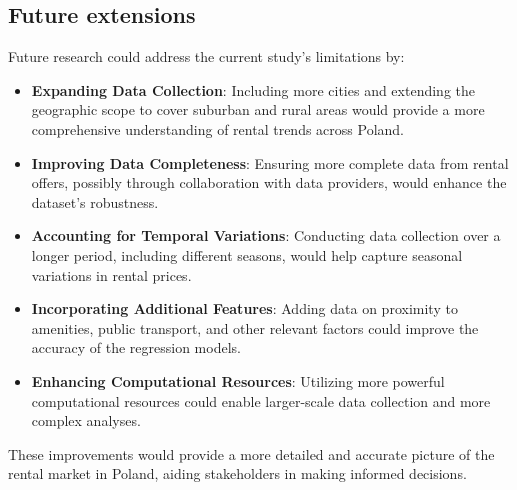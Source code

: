\subsection{Future extensions}
Future research could address the current study's limitations by:
\begin{itemize}
    \item \textbf{Expanding Data Collection}: Including more cities and extending the geographic scope to cover suburban and rural areas would provide a more comprehensive understanding of rental trends across Poland.
    \item \textbf{Improving Data Completeness}: Ensuring more complete data from rental offers, possibly through collaboration with data providers, would enhance the dataset's robustness.
    \item \textbf{Accounting for Temporal Variations}: Conducting data collection over a longer period, including different seasons, would help capture seasonal variations in rental prices.
    \item \textbf{Incorporating Additional Features}: Adding data on proximity to amenities, public transport, and other relevant factors could improve the accuracy of the regression models.
    \item \textbf{Enhancing Computational Resources}: Utilizing more powerful computational resources could enable larger-scale data collection and more complex analyses.
\end{itemize}
These improvements would provide a more detailed and accurate picture of the rental market in Poland, aiding stakeholders in making informed decisions.